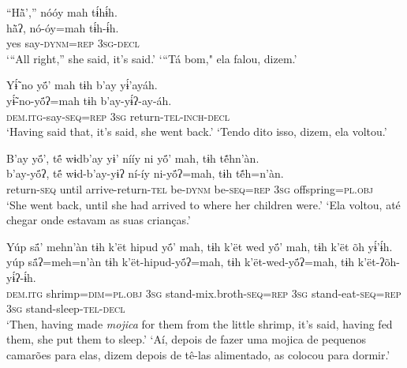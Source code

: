 \documentclass[output=paper,
modfonts,nonflat
]{langsci/langscibook}
\begin{document}
\ea  “Hä̀’,” nóóy mah tɨ́hɨ́h.\\ 
\gll hä̀ʔ, nó-óy=mah tɨ́h-ɨ́h.\\
     yes say\textsc{-dynm=rep} \textsc{3sg-decl}\\
\glt ‘“All right,” she said, it’s said.'
\glt ‘“Tá bom," ela falou, dizem.'
\z 

\ea  Yɨ̃́ no yö́’ mah tɨh b’ay yɨ́’ayáh.\\ 
\gll yɨ̃́-no-yö́ʔ=mah tɨh b’ay-yɨ́ʔ-ay-áh.\\
     \textsc{dem.itg-}say\textsc{-seq=rep} \textsc{3sg} return\textsc{-tel-inch-decl}\\
\glt ‘Having said that, it’s said, she went back.'
\glt ‘Tendo dito isso, dizem, ela voltou.'
\z 

\ea  B’ay yö́’, të́ wɨdb’ay yɨ’ nííy ni yö́’ mah, tɨh tẽ́hn’àn.\\ 
\gll b’ay-yö́ʔ, të́ wɨd-b’ay-yɨʔ ní-íy ni-yö́ʔ=mah, tɨh tẽ́h=n’àn.\\
     return\textsc{-seq} until arrive-return\textsc{-tel} be\textsc{-dynm} be-\textsc{seq=rep} \textsc{3sg} offspring=\textsc{pl.obj}\\
\glt ‘She went back, until she had arrived to where her children were.'
\glt ‘Ela voltou, até chegar onde estavam as suas crianças.'
\z 

\ea  Yúp sä́’ mehn’àn tɨh k’ët hipud yö́’ mah, tɨh k’ët wed yö́’ mah, tɨh k’ët õh yɨ́’ɨ́h.\\ 
\gll yúp sä́ʔ=meh=n’àn tɨh k’ët-hipud-yö́ʔ=mah, tɨh k’ët-wed-yö́ʔ=mah, tɨh k’ët-ʔõh-yɨ́ʔ-ɨ́h.\\
    \textsc{dem.itg} shrimp\textsc{=dim=pl.obj} \textsc{3sg} stand-mix.broth\textsc{-seq=rep} \textsc{3sg} stand-eat\textsc{-seq=rep} \textsc{3sg} stand-sleep\textsc{-tel-decl}\\
\glt ‘Then, having made \textit{mojica}{\footnotemark} for them from the little shrimp, it’s said, having fed them, she put them to sleep.'
\glt ‘Aí, depois de fazer uma mojica de pequenos camarões para elas, dizem depois de tê-las alimentado, as colocou para dormir.'
\z
\end{document}
